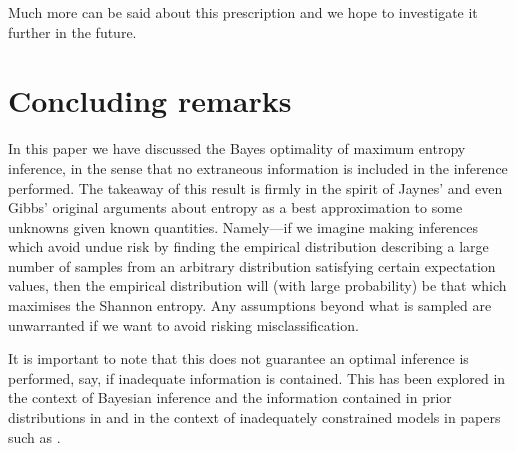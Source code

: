 \documentclass[11pt]{amsart}
\numberwithin{equation}{section}
\theoremstyle{remark}
\theoremstyle{remark}
\begin{document}
Much more can be said about this prescription and we hope to investigate it further in the future. 


\section{Concluding remarks}

In this paper we have discussed the Bayes optimality of maximum entropy inference, in the sense that no extraneous information is included in the inference performed. The takeaway of this result is firmly in the spirit of Jaynes' and even Gibbs' original arguments about entropy as a best approximation to some unknowns given known quantities. Namely---if we imagine making inferences which avoid undue risk by finding the empirical distribution describing a large number of samples from an arbitrary distribution satisfying certain expectation values, then the empirical distribution will (with large probability) be that which maximises the Shannon entropy. Any assumptions beyond what is sampled are unwarranted if we want to avoid risking misclassification. 

It is important to note that this does not guarantee an optimal inference is performed, say, if inadequate information is contained. This has been explored in the context of Bayesian inference and the information contained in prior distributions in \cite{wolpert1996reconciling} and in the context of inadequately constrained models in papers such as \cite{presse, agozzino2019minimal}.



\end{document}
